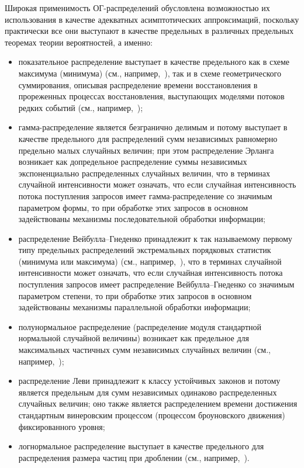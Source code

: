 \begin{multicols}{2}
Широкая применимость ОГ-рас\-пре\-де\-ле\-ний обусловлена возможностью их
использования в качестве адекватных асимптотических аппроксимаций,
поскольку практически все они выступают в качестве предельных в
различных предельных теоремах теории вероятностей, а именно:
\begin{itemize}
\item показательное распределение выступает в качестве предельного
как в схеме максимума (минимума) (см., например,~\cite{Gumbel1965}), 
так и в схеме геометрического суммирования,
описывая распределение времени восстановления в прореженных
процессах восстановления, высту\-па\-ющих моделями потоков редких
событий (см., например,~\cite{Kalashnikov1997});
\item гамма-распределение является безгранично делимым и потому
выступает в качестве предельного для распределений сумм
независимых равномерно предельно малых случайных величин; при этом
распределение Эрланга возникает как\linebreak
допредельное распределение
суммы независимых экспоненциально распределенных случайных
величин, что в терминах случайной интенсивности может означать,
что если \mbox{случайная} интенсивность потока поступления запросов
имеет гам\-ма-рас\-пре\-де\-ле\-ние со значимым параметром формы, то при
обработке этих запросов в основном задействованы механизмы
последовательной обработки информации;
\item распределение Вей\-бул\-ла--Гне\-ден\-ко принадлежит к так
называемому первому типу предельных распределений экстремальных
порядковых статистик (минимума или максимума) (см.,\linebreak
например,~\cite{Gumbel1965}), 
что в терминах случайной интенсивности может
означать, что если случайная интенсивность потока поступления
запросов имеет распределение Вей\-бул\-ла--Гне\-ден\-ко со значимым
параметром степени, то при обработке этих запросов в основном
задействованы механизмы параллельной обработки информации;
\item полунормальное распределение (распределение модуля
стандартной нормальной случайной величины) возникает как
предельное для максимальных частичных сумм независимых случайных
величин (см., например,~\cite{KorolevSokolov2008});
\item распределение Леви принадлежит к классу устойчивых законов и
потому является предельным для сумм независимых одинаково
распределенных случайных величин; оно также является
распределением времени достижения стандартным винеровским
процессом (процессом броуновского движения) фиксированного уровня;
\item логнормальное распределение выступает в качестве предельного
для распределения размера частиц при дроблении (см., например,~\cite{Korolev2009}).
\end{itemize}


\end{multicols}
